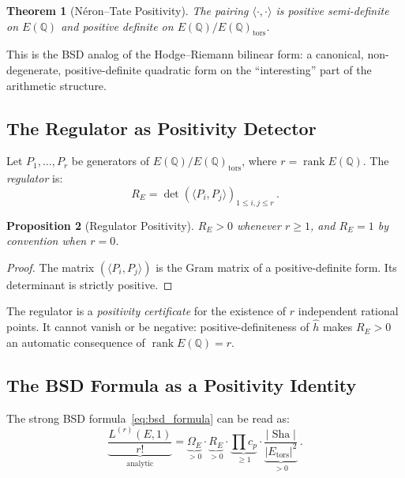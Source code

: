 \documentclass[aps,prd,twocolumn,superscriptaddress,nofootinbib,floatfix]{revtex4-2}
\newtheorem{theorem}{Theorem}[section]
\newtheorem{proposition}[theorem]{Proposition}
\theoremstyle{definition}
\theoremstyle{remark}
\DeclareMathOperator{\rank}{rank}
\DeclareMathOperator{\Sha}{Sha}
\begin{document}
\begin{theorem}[Néron--Tate Positivity]
\label{thm:NT_positive}
The pairing $\langle \cdot, \cdot \rangle$ is positive semi-definite on $E(\mathbb{Q})$ and positive definite on $E(\mathbb{Q})/E(\mathbb{Q})_{\mathrm{tors}}$.
\end{theorem}

This is the BSD analog of the Hodge--Riemann bilinear form: a canonical, non-degenerate, positive-definite quadratic form on the ``interesting'' part of the arithmetic structure.

\subsection{The Regulator as Positivity Detector}

Let $P_1, \ldots, P_r$ be generators of $E(\mathbb{Q})/E(\mathbb{Q})_{\mathrm{tors}}$, where $r = \rank E(\mathbb{Q})$. The \textit{regulator} is:
\begin{equation}
R_E = \det\!\left(\langle P_i, P_j \rangle\right)_{1 \leq i,j \leq r}\,.
\label{eq:regulator}
\end{equation}

\begin{proposition}[Regulator Positivity]
\label{prop:reg_positive}
$R_E > 0$ whenever $r \geq 1$, and $R_E = 1$ by convention when $r = 0$.
\end{proposition}

\begin{proof}
The matrix $(\langle P_i, P_j \rangle)$ is the Gram matrix of a positive-definite form. Its determinant is strictly positive.
\end{proof}

The regulator is a \textit{positivity certificate} for the existence of $r$ independent rational points. It cannot vanish or be negative: positive-definiteness of $\hat{h}$ makes $R_E > 0$ an automatic consequence of $\rank E(\mathbb{Q}) = r$.

\subsection{The BSD Formula as a Positivity Identity}

The strong BSD formula~\eqref{eq:bsd_formula} can be read as:
\begin{equation}
\underbrace{\frac{L^{(r)}(E,1)}{r!}}_{\text{analytic}} = \underbrace{\Omega_E}_{> 0} \cdot \underbrace{R_E}_{> 0} \cdot \underbrace{\prod c_p}_{\geq 1} \cdot \underbrace{\frac{|\Sha|}{|E_{\mathrm{tors}}|^2}}_{> 0}\,.
\label{eq:bsd_positivity}
\end{equation}
\end{document}
